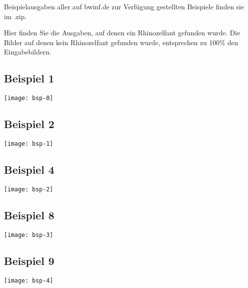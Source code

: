 Beispielausgaben aller auf bwinf.de zur Verfügung gestellten Beispiele finden sie im .zip.

Hier finden Sie die Ausgaben, auf denen ein Rhinozelfant gefunden wurde. Die Bilder auf denen kein Rhinozelfant gefunden wurde, entsprechen zu 100\% den Eingabebildern.

\subsection{Beispiel 1}
	\centering
	\texttt{[image: bsp-0]}
\subsection{Beispiel 2}
	\centering
	\texttt{[image: bsp-1]}
\subsection{Beispiel 4}
	\centering
	\texttt{[image: bsp-2]}
\subsection{Beispiel 8}
	\centering
	\texttt{[image: bsp-3]}
\subsection{Beispiel 9}
	\centering
	\texttt{[image: bsp-4]}







